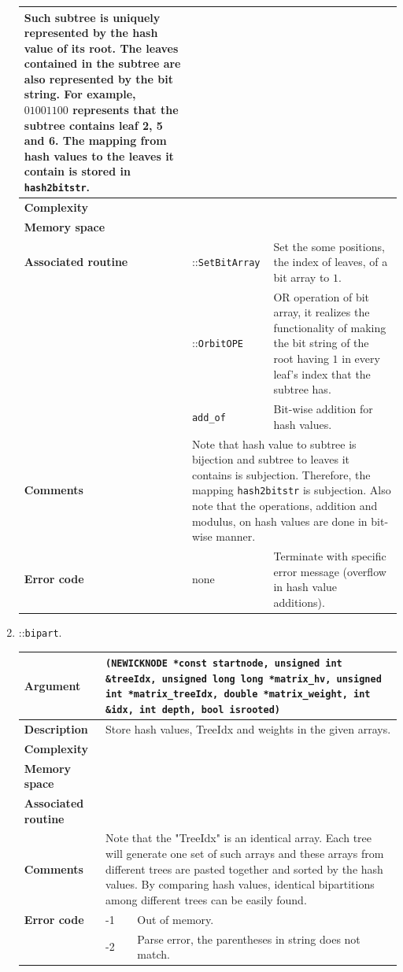 \documentclass[11pt,a4paper]{article}
\newcommand{\myuline}[1]{%
	\uline{\phantom{#1}}%
	\llap{\contour{white}{#1}}%
}
\newcommand{\mrref}[1]{\texttt{#1}\label{#1}}
\newcommand{\mtref}[2]{\texttt{#1}\label{#2}}
\newcommand{\rref}[1]{\hyperref[#1]{\textcolor{blue}{\myuline{\texttt{#1}}}}}
\theoremstyle{definition}
\theoremstyle{definition}
\numberwithin{equation}{section}
\begin{document}
\begin{enumerate}
\begin{tabular}{>{\bfseries}lp{}p{}}
{			Such subtree is uniquely represented by the hash value of its root. The leaves contained in the subtree are also represented by the bit string. For example, $01001100$ represents that the subtree contains leaf 2, 5 and 6. The mapping from hash values to the leaves it contain is stored in \texttt{hash2bitstr}.} \\
			\hline
			Complexity&   &  \\
			Memory space&   &  \\
			\hline
			Associated routine& \rref{Array}::\mrref{SetBitArray} & Set the some positions, the index of leaves, of a bit array to $1$.\\
			& \rref{Array}::\mrref{OrbitOPE} & OR operation of bit array, it realizes the functionality of making the bit string of the root having $1$ in every leaf's index that the subtree has.\\
			& \mtref{add\_of}{addof} & Bit-wise addition for hash values.\\
			\hline
			Comments & \multicolumn{2}{p{0.6\textwidth}}{Note that hash value to subtree is bijection and subtree to leaves it contains is subjection. Therefore, the mapping \texttt{hash2bitstr} is subjection. Also note that the operations, addition and modulus, on hash values are done in bit-wise manner.} \\
			\hline
			Error code & none & Terminate with specific error message (overflow in hash value additions).\\
			\hline
		\end{tabular}
	
		\item \rref{TreeOPE}::\mrref{bipart}.
		
		\begin{tabular}{>{\bfseries}lp{}p{}}
			\hline
			Argument & \multicolumn{2}{p{0.6\textwidth}}{\texttt{(NEWICKNODE *const startnode, unsigned int \&treeIdx,
					unsigned long long *matrix\_hv,
					unsigned int *matrix\_treeIdx,
					double *matrix\_weight, int \&idx, int depth, bool isrooted)}} \\
			\hline
			Description & \multicolumn{2}{p{0.6\textwidth}}{Store hash values, TreeIdx and weights in the given arrays.} \\
			\hline
			Complexity&   &  \\
			Memory space&   &  \\
			\hline
			Associated routine&   & \\
			\hline
			Comments & \multicolumn{2}{p{0.6\textwidth}}{Note that the "TreeIdx" is an identical array. Each tree will generate one set of such arrays and these arrays from different trees are pasted together and sorted by the hash values. By comparing hash values, identical bipartitions among different trees can be easily found.} \\
			\hline
			Error code & -1 & Out of memory.\\
			& -2 & Parse error, the parentheses in string does not match.\\
			\hline
		\end{tabular}
	

\end{enumerate}
\end{document}
